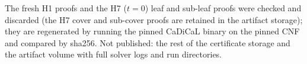 \documentclass{anvil-paper}
\theoremstyle{definition}
\begin{document}
The fresh H1 proofs and the H7 ($t=0$) leaf and sub-leaf proofs were checked and discarded (the H7 cover and sub-cover proofs are retained in the artifact storage); they are regenerated by running the pinned CaDiCaL binary on the pinned CNF and compared by sha256. Not published: the rest of the certificate storage and the artifact volume with full solver logs and run directories.



\end{document}
